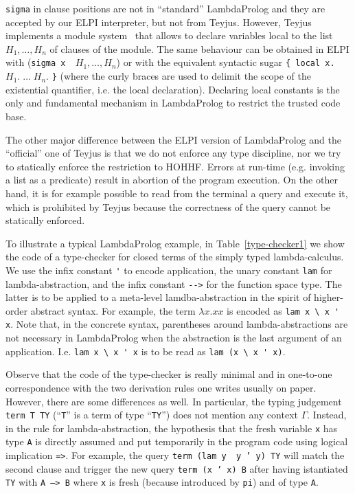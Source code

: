 \documentclass[preprint]{sigplanconf}
\begin{document}
\texttt{sigma} in clause positions are not in ``standard'' LambdaProlog and they are accepted by our ELPI interpreter, but not from Teyjus. However, Teyjus implements a module system~\cite{gopalan1} that allows to declare variables local to the list $H_1,\ldots, H_n$ of clauses of the module. The same behaviour can be obtained in ELPI with (\texttt{sigma x \ }$H_1, \ldots, H_n$) or with the equivalent
syntactic sugar \texttt{\{ local x.} $H_1.\;\ldots\; H_n.$ \texttt{\}} (where the curly braces are used to delimit the scope of the existential quantifier, i.e. the local declaration). Declaring local constants is the only and fundamental mechanism in LambdaProlog to restrict the trusted code base.

The other major difference between the ELPI version of LambdaProlog and the ``official'' one of Teyjus is that we do not enforce any type discipline, nor we try to statically enforce the restriction to HOHHF. Errors at run-time (e.g. invoking a list as a predicate) result in abortion of the program execution. On the other hand, it is for example possible to read from the terminal a query and execute it, which is prohibited by Teyjus because the correctness of the query cannot be statically enforced.

To illustrate a typical LambdaProlog example, in Table~\ref{type-checker1} we show the code of a type-checker for closed terms of the simply typed lambda-calculus. We use the infix constant \verb+'+ to encode application, the unary constant \verb+lam+ for lambda-abstraction, and the infix constant \verb+-->+ for the function space type. The latter is to be applied to a meta-level lamdba-abstraction in the spirit of higher-order abstract syntax. For example, the term $\lambda x.xx$ is encoded as \verb+lam x \ x ' x+. Note that, in the concrete syntax, parentheses around lambda-abstractions are not necessary in LambdaProlog when the abstraction is the last argument of an application. I.e. \verb+lam x \ x ' x+ is to be read as \verb+lam (x \ x ' x)+.

Observe that the code of the type-checker is really minimal and in one-to-one correspondence with the two derivation rules one writes usually on paper. However, there are some differences as well. In particular, the typing judgement \texttt{term T TY} (``\texttt{T}'' is a term of type ``\texttt{TY}'') does not mention any context $\Gamma$. Instead, in the rule for lambda-abstraction, the hypothesis that the fresh variable \texttt{x} has type \texttt{A} is directly assumed and put temporarily in the program code using logical implication \texttt{=>}.
For example, the query \texttt{term (lam y \ y ' y) TY} will match the second
clause and trigger the new query \texttt{term (x ' x) B} after having istantiated \texttt{TY} with \texttt{A --> B} where \texttt{x} is fresh (because introduced by \texttt{pi}) and of type \texttt{A}.
\end{document}
